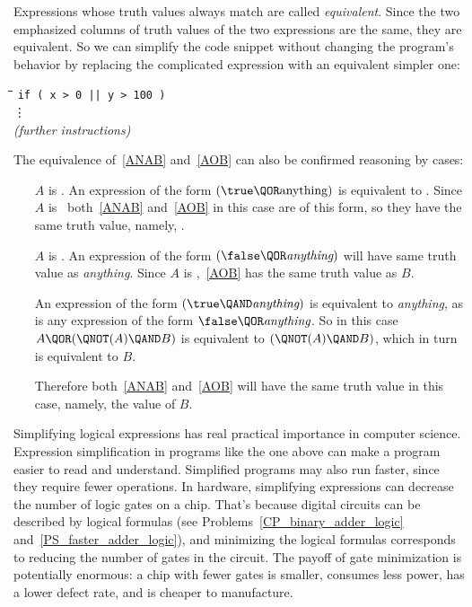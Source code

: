 Expressions whose truth values always match are called%
%
\emph{equivalent}.  Since the two emphasized columns of truth values
of the two expressions are the same, they are equivalent.  So we can
simplify the code snippet without changing the program's behavior by
replacing the complicated expression with an equivalent simpler one:
%
\begin{tabbing}
\hspace{1in} \= \quad\quad \= \quad\quad \= \quad\quad \= \kill
\> \texttt{if ( x > 0 || y > 100 )} \\
\> \> \vdots\\
\> \emph{(further instructions)}
\end{tabbing}

The equivalence of~\eqref{ANAB} and~\eqref{AOB} can also be confirmed
reasoning by cases:
\begin{itemize}
\item[$A$ is \true.]  An expression of the form $(\true \QOR
  \text{anything})$ is equivalent to \true.  Since $A$ is \true\
  both~\eqref{ANAB} and~\eqref{AOB} in this case are of this form, so they
  have the same truth value, namely, \true.

\item[$A$ is \false.]  An expression of the form $(\false \QOR
  \textit{anything})$ will have same truth value as \emph{anything}.
  Since $A$ is \false,~\eqref{AOB} has the same truth value as $B$.

   An expression of the form $(\true \QAND \textit{anything})$ is
   equivalent to \emph{anything}, as is any expression of the form
   $\false \QOR \emph{anything}$.  So in this case $A \QOR (\QNOT(A)
   \QAND B)$ is equivalent to $(\QNOT(A) \QAND B)$, which in turn is
   equivalent to $B$.

   Therefore both~\eqref{ANAB} and~\eqref{AOB} will have the same truth
   value in this case, namely, the value of $B$.
\end{itemize}

Simplifying logical expressions has real practical importance in
computer science.  Expression simplification in programs like the one
above can make a program easier to read and understand. Simplified
programs may also run faster, since they require fewer operations.  In
hardware, simplifying expressions can decrease the number of logic
gates on a chip.  That's because digital circuits can be described by
logical formulas (see Problems~\ref{CP_binary_adder_logic}
and~\ref{PS_faster_adder_logic}), and minimizing the logical formulas
corresponds to reducing the number of gates in the circuit.  The
payoff of gate minimization is potentially enormous: a chip with fewer
gates is smaller, consumes less power, has a lower defect rate, and is
cheaper to manufacture.

